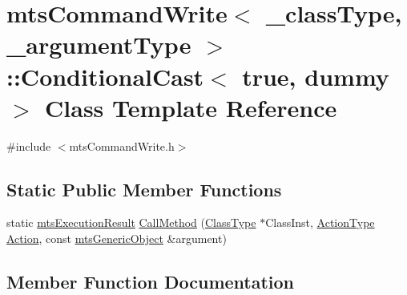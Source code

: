 \hypertarget{classmts_command_write_1_1_conditional_cast_3_01true_00_01dummy_01_4}{}\section{mts\+Command\+Write$<$ \+\_\+class\+Type, \+\_\+argument\+Type $>$\+:\+:Conditional\+Cast$<$ true, dummy $>$ Class Template Reference}
\label{classmts_command_write_1_1_conditional_cast_3_01true_00_01dummy_01_4}


{\ttfamily \#include $<$mts\+Command\+Write.\+h$>$}

\subsection*{Static Public Member Functions}
\begin{DoxyCompactItemize}
\item 
static \hyperlink{classmts_execution_result}{mts\+Execution\+Result} \hyperlink{classmts_command_write_1_1_conditional_cast_3_01true_00_01dummy_01_4_a266e6d67fbb7171a9234653dbee9cd72}{Call\+Method} (\hyperlink{classmts_command_write_aeccc8c434133c4adae34916b42ad493c}{Class\+Type} $\ast$Class\+Inst, \hyperlink{classmts_command_write_adb59c0a9491a687d96877bb27516b0e7}{Action\+Type} \hyperlink{classmts_command_write_affee375369797c3ffb3aba6578d33b23}{Action}, const \hyperlink{classmts_generic_object}{mts\+Generic\+Object} \&argument)
\end{DoxyCompactItemize}


\subsection{Member Function Documentation}
\hypertarget{classmts_command_write_1_1_conditional_cast_3_01true_00_01dummy_01_4_a266e6d67fbb7171a9234653dbee9cd72}{}
